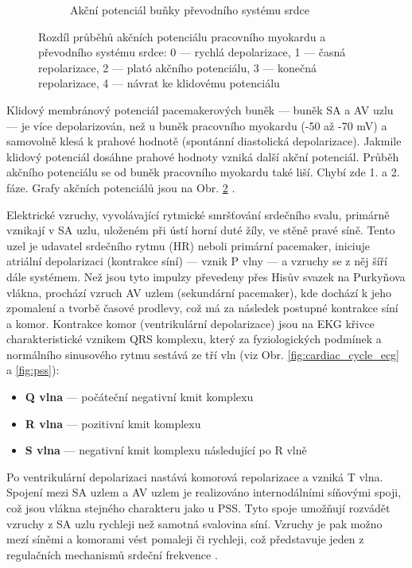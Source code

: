 \begin{figure}[h]
\begin{subfigure}{0.5\textwidth}
		\caption{Akční potenciál buňky převodního systému srdce
			\cite{Petrek2019}}
		\label{fig:pss_ap}
	\end{subfigure}
	\caption{Rozdíl průběhů akčních potenciálu pracovního myokardu a převodního
		systému srdce: 0 --- rychlá depolarizace, 1 --- časná repolarizace, 2
		--- plató akčního potenciálu, 3 --- konečná repolarizace, 4 --- návrat
		ke klidovému potenciálu}
	\label{fig:ap}
\end{figure}

Klidový membránový potenciál pacemakerových buněk --- buněk SA a AV uzlu --- je
více depolarizován, než u buněk pracovního myokardu (-50 až -70 mV) a samovolně
klesá k prahové hodnotě (spontánní diastolická depolarizace). Jakmile klidový
potenciál dosáhne prahové hodnoty vzniká další akční potenciál. Průběh akčního
potenciálu se od buněk pracovního myokardu také liší. Chybí zde 1. a 2. fáze.
Grafy akčních potenciálů jsou na Obr. \ref{fig:ap} \cite{Petrek2019}.

Elektrické vzruchy, vyvolávající rytmické smršťování srdečního svalu, primárně
vznikají v SA uzlu, uloženém při ústí horní duté žíly, ve stěně pravé síně.
Tento uzel je udavatel srdečního rytmu (HR) neboli primární pacemaker, iniciuje
atriální depolarizaci (kontrakce síní) --- vznik P vlny --- a vzruchy se z něj
šíří dále systémem. Než jsou tyto impulzy převedeny přes Hisův svazek na
Purkyňova vlákna, prochází vzruch AV uzlem (sekundární pacemaker), kde dochází k
jeho zpomalení a tvorbě časové prodlevy, což má za následek postupné kontrakce
síní a komor. Kontrakce komor (ventrikulární depolarizace) jsou na EKG křivce
charakteristické vznikem QRS komplexu, který za fyziologických podmínek a
normálního sinusového rytmu sestává ze tří vln (viz Obr.
\ref{fig:cardiac_cycle_ecg} a \ref{fig:pss}):
\begin{itemize}[noitemsep]
	\item \textbf{Q vlna} --- počáteční negativní kmit komplexu
	\item \textbf{R vlna} --- pozitivní kmit komplexu
	\item \textbf{S vlna} --- negativní kmit komplexu následující po R vlně
\end{itemize}

Po ventrikulární depolarizaci nastává komorová repolarizace a vzniká T vlna.
Spojení mezi SA uzlem a AV uzlem je realizováno internodálními síňovými spoji,
což jsou vlákna stejného charakteru jako u PSS. Tyto spoje umožňují rozvádět
vzruchy z SA uzlu rychleji než samotná svalovina síní. Vzruchy je pak možno mezí
síněmi a komorami vést pomaleji či rychleji, což představuje jeden z regulačních
mechanismů srdeční frekvence \cite{Dylevsky2013,Cihak2016}.

